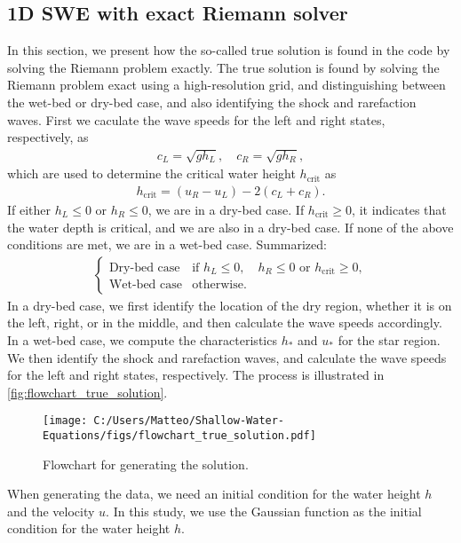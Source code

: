 \subsection*{1D SWE with exact Riemann solver}
In this section, we present how the so-called true solution is found in the code by solving the Riemann problem exactly.
The true solution is found by solving the Riemann problem exact using a high-resolution grid, and distinguishing between the wet-bed or dry-bed case, and also identifying the shock and rarefaction waves.
First we caculate the wave speeds for the left and right states, respectively, as
\begin{align*}
    c_L = \sqrt{g h_L}, \quad c_R = \sqrt{g h_R},
\end{align*}
which are used to determine the critical water height $h_{\text{crit}}$ as
\begin{align*}
    h_{\text{crit}} = (u_R - u_L) - 2(c_L + c_R).
\end{align*}
If either $h_L \leq 0$ or $h_R \leq 0$, we are in a dry-bed case.
If $h_{\text{crit}} \geq 0$, it indicates that the water depth is critical, and we are also in a dry-bed case.
If none of the above conditions are met, we are in a wet-bed case.
Summarized:
\begin{align*}
    \begin{cases}
        \text{Dry-bed case} & \text{if }  h_L \leq 0, \quad  h_R \leq 0 \text{ or } h_{\text{crit}} \geq 0, \\
        \text{Wet-bed case} & \text{otherwise}.
    \end{cases}
\end{align*}
In a dry-bed case, we first identify the location of the dry region, whether it is on the left, right, or in the middle, and then calculate the wave speeds accordingly.
In a wet-bed case, we compute the characteristics $h_*$ and $u_*$ for the star region.
We then identify the shock and rarefaction waves, and calculate the wave speeds for the left and right states, respectively.
The process is illustrated in \autoref{fig:flowchart_true_solution}.
\begin{figure}[H]
    \centering
    \texttt{[image: C:/Users/Matteo/Shallow-Water-Equations/figs/flowchart\_true\_solution.pdf]}
    \caption{Flowchart for generating the solution.}\label{fig:flowchart_true_solution}
\end{figure}
When generating the data, we need an initial condition for the water height $h$ and the velocity $u$.
In this study, we use the Gaussian function as the initial condition for the water height $h$.
